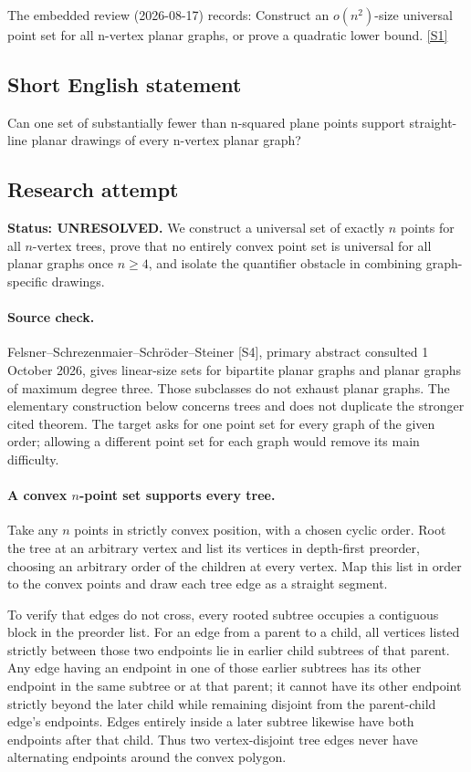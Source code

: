 \documentclass[11pt,a4paper]{article}
\newcommand{\sref}[2]{\hyperlink{source:#1:#2}{[S#2]}}
\begin{document}
The embedded review (2026-08-17) records: Construct an $o(n^2)$-size universal point set for all n-vertex planar graphs, or prove a quadratic lower bound. \sref{1409}{1}

\subsection{Short English statement}

Can one set of substantially fewer than n-squared plane points support straight-line planar drawings of every n-vertex planar graph?

\subsection{Research attempt}
\textbf{Status: UNRESOLVED.} We construct a universal set of exactly $n$ points for all $n$-vertex trees, prove that no entirely convex point set is universal for all planar graphs once $n\ge4$, and isolate the quantifier obstacle in combining graph-specific drawings.

\paragraph{Source check.}
Felsner--Schrezenmaier--Schr\"oder--Steiner [S4], primary abstract consulted 1 October 2026, gives linear-size sets for bipartite planar graphs and planar graphs of maximum degree three. Those subclasses do not exhaust planar graphs. The elementary construction below concerns trees and does not duplicate the stronger cited theorem. The target asks for one point set for every graph of the given order; allowing a different point set for each graph would remove its main difficulty.

\paragraph{A convex $n$-point set supports every tree.}
Take any $n$ points in strictly convex position, with a chosen cyclic order. Root the tree at an arbitrary vertex and list its vertices in depth-first preorder, choosing an arbitrary order of the children at every vertex. Map this list in order to the convex points and draw each tree edge as a straight segment.

To verify that edges do not cross, every rooted subtree occupies a contiguous block in the preorder list. For an edge from a parent to a child, all vertices listed strictly between those two endpoints lie in earlier child subtrees of that parent. Any edge having an endpoint in one of those earlier subtrees has its other endpoint in the same subtree or at that parent; it cannot have its other endpoint strictly beyond the later child while remaining disjoint from the parent-child edge's endpoints. Edges entirely inside a later subtree likewise have both endpoints after that child. Thus two vertex-disjoint tree edges never have alternating endpoints around the convex polygon.
\end{document}

